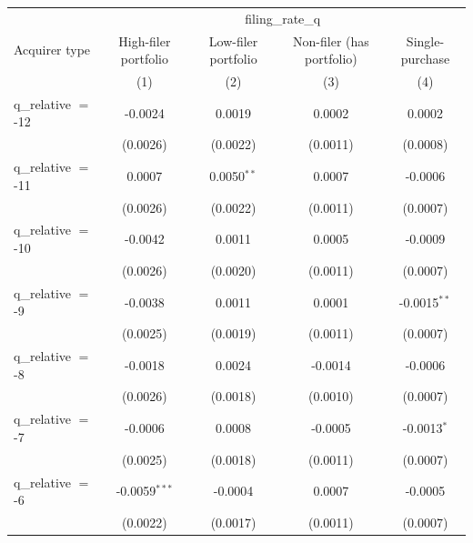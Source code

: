 
\begingroup
\centering
\begin{tabular}{lcccc}
   \toprule
    & \multicolumn{4}{c}{filing\_rate\_q}\\
   Acquirer type        & High-filer portfolio & Low-filer portfolio & Non-filer (has portfolio) & Single-purchase \\   
                        & (1)                  & (2)                 & (3)                       & (4)\\  
   \midrule 
   q\_relative $=$ -12  & -0.0024              & 0.0019              & 0.0002                    & 0.0002\\   
                        & (0.0026)             & (0.0022)            & (0.0011)                  & (0.0008)\\   
   q\_relative $=$ -11  & 0.0007               & 0.0050$^{**}$       & 0.0007                    & -0.0006\\   
                        & (0.0026)             & (0.0022)            & (0.0011)                  & (0.0007)\\   
   q\_relative $=$ -10  & -0.0042              & 0.0011              & 0.0005                    & -0.0009\\   
                        & (0.0026)             & (0.0020)            & (0.0011)                  & (0.0007)\\   
   q\_relative $=$ -9   & -0.0038              & 0.0011              & 0.0001                    & -0.0015$^{**}$\\   
                        & (0.0025)             & (0.0019)            & (0.0011)                  & (0.0007)\\   
   q\_relative $=$ -8   & -0.0018              & 0.0024              & -0.0014                   & -0.0006\\   
                        & (0.0026)             & (0.0018)            & (0.0010)                  & (0.0007)\\   
   q\_relative $=$ -7   & -0.0006              & 0.0008              & -0.0005                   & -0.0013$^{*}$\\   
                        & (0.0025)             & (0.0018)            & (0.0011)                  & (0.0007)\\   
   q\_relative $=$ -6   & -0.0059$^{***}$      & -0.0004             & 0.0007                    & -0.0005\\   
                        & (0.0022)             & (0.0017)            & (0.0011)                  & (0.0007)\\   

\end{tabular}
